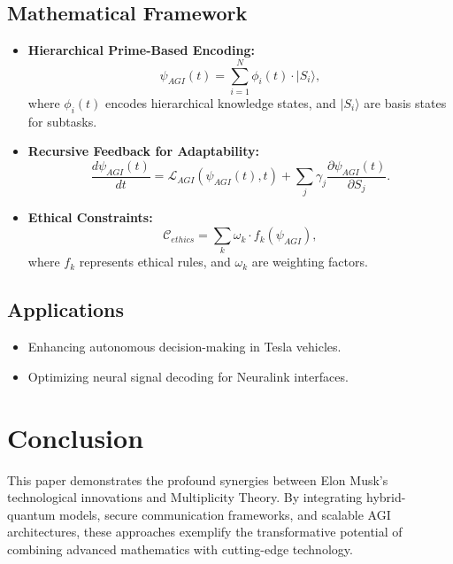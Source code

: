 \documentclass{article}
\theoremstyle{plain}
\begin{document}
\subsection{Mathematical Framework}
\begin{itemize}
  \item \textbf{Hierarchical Prime-Based Encoding:}
  \begin{equation}
  \psi_{AGI}(t) = \sum_{i=1}^N \phi_i(t) \cdot |S_i\rangle,
  \end{equation}
  where $\phi_i(t)$ encodes hierarchical knowledge states, and $|S_i\rangle$ are basis states for subtasks.

  \item \textbf{Recursive Feedback for Adaptability:}
  \begin{equation}
  \frac{d\psi_{AGI}(t)}{dt} = \mathcal{L}_{AGI}(\psi_{AGI}(t), t) + \sum_{j} \gamma_j \frac{\partial \psi_{AGI}(t)}{\partial S_j}.
  \end{equation}

  \item \textbf{Ethical Constraints:}
  \begin{equation}
  \mathcal{C}_{ethics} = \sum_{k} \omega_k \cdot f_k(\psi_{AGI}),
  \end{equation}
  where $f_k$ represents ethical rules, and $\omega_k$ are weighting factors.
\end{itemize}

\subsection{Applications}
\begin{itemize}
  \item Enhancing autonomous decision-making in Tesla vehicles.
  \item Optimizing neural signal decoding for Neuralink interfaces.
\end{itemize}

\section{Conclusion}
This paper demonstrates the profound synergies between Elon Musk's technological innovations and Multiplicity Theory. By integrating hybrid-quantum models, secure communication frameworks, and scalable AGI architectures, these approaches exemplify the transformative potential of combining advanced mathematics with cutting-edge technology.

\nocite{*}


\end{document}
